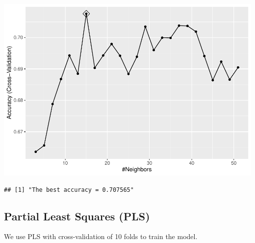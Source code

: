 \documentclass[]{article}
\newenvironment{Shaded}{\begin{snugshade}}{\end{snugshade}}
\newcommand{\CommentTok}[1]{\textcolor[rgb]{0.56,0.35,0.01}{\textit{#1}}}
\newcommand{\DataTypeTok}[1]{\textcolor[rgb]{0.13,0.29,0.53}{#1}}
\newcommand{\KeywordTok}[1]{\textcolor[rgb]{0.13,0.29,0.53}{\textbf{#1}}}
\newcommand{\NormalTok}[1]{#1}
\newcommand{\OperatorTok}[1]{\textcolor[rgb]{0.81,0.36,0.00}{\textbf{#1}}}
\newcommand{\StringTok}[1]{\textcolor[rgb]{0.31,0.60,0.02}{#1}}
\begin{document}
\includegraphics{LiverDisease_files/figure-latex/unnamed-chunk-24-1.pdf}

\begin{Shaded}
\end{Shaded}

\begin{verbatim}
## [1] "The best accuracy = 0.707565"
\end{verbatim}

\begin{Shaded}
\end{Shaded}

\subsection{Partial Least Squares (PLS)}

We use PLS with cross-validation of 10 folds to train the model.
\end{document}
